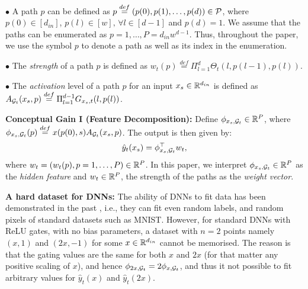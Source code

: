 $\bullet$ A path $p$ can be defined as $p\stackrel{def}=(p(0),p(1),\ldots,p(d))\in \P$, where $p(0)\in [d_{in}]$, $p(l)\in[w],\,\forall l\in[d-1]$ and $p(d)=1$. We assume that the paths can be enumerated as $p=1,\ldots, P = d_{in}w^{d-1}$. Thus, throughout the paper, we use the symbol $p$ to denote a path as well as its index in the enumeration.

$\bullet$ The \emph{strength} of a path $p$ is defined as $w_t(p)\stackrel{def}=\Pi_{l=1}^d \Theta_t(l,p(l-1),p(l))$. 

$\bullet$ The \emph{activation} level of a path $p$ for an input $x_s\in \R^{d_{in}}$ is defined as $A_{\G_t}(x_s,p)\stackrel{def}{=}\Pi_{l=1}^{d-1} G_{x_s,t}(l,p(l))$.

\textbf{Conceptual Gain I (Feature Decomposition):} Define $\phi_{x_s,\G_t}\in \R^P$, where $\phi_{x_s,\G_t}(p)\stackrel{def}=x(p(0),s)A_{\G_t}(x_s,p)$. The output is then given by:
\begin{align}\label{eq:featstrength}
\hat{y}_{t}(x_s)=\phi_{x_s,\G_t }^\top w_{t},
\end{align}	
where $w_{t}=(w_{t}(p),p=1,\ldots,P)\in \R^P$. In this paper, we interpret $\phi_{x_s,\G_t}\in \R^P$ as the \emph{hidden feature} and $w_{t}\in \R^P$, the strength of the paths as the \emph{weight vector}.

\textbf{A hard dataset for DNNs:} The ability of DNNs to fit data has been demonstrated in the past \cite{ben}, i.e., they can fit even random labels, and random pixels of standard datasets such as MNIST. %
However, for standard DNNs with ReLU gates, with no bias parameters, a dataset with $n=2$ points namely $(x,1)$ and $(2x,-1)$ for some $x\in \R^{d_{in}}$ cannot be memorised. The reason is that the gating values are the same for both $x$ and $2x$ (for that matter any positive scaling of $x$), and hence $\phi_{2x,\G_t }= 2\phi_{x,\G_t }$, and thus it not possible to fit arbitrary values for $\hat{y}_t(x)$ and $\hat{y}_t(2x)$. 


